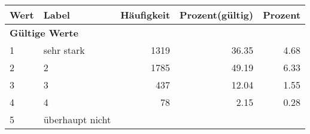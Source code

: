      \begin{longtable}{lXrrr}
     \toprule
     \textbf{Wert} & \textbf{Label} & \textbf{Häufigkeit} & \textbf{Prozent(gültig)} & \textbf{Prozent} \\
     \endhead
     \midrule
     \multicolumn{5}{l}{\textbf{Gültige Werte}}\\

     1 &
     \multicolumn{1}{X}{ sehr stark   } &


       \num{1319} &
       \num[round-mode=places,round-precision=2]{36.35} &
         \num[round-mode=places,round-precision=2]{4.68} \\

     2 &
     \multicolumn{1}{X}{ 2   } &


       \num{1785} &
       \num[round-mode=places,round-precision=2]{49.19} &
         \num[round-mode=places,round-precision=2]{6.33} \\

     3 &
     \multicolumn{1}{X}{ 3   } &


       \num{437} &
       \num[round-mode=places,round-precision=2]{12.04} &
         \num[round-mode=places,round-precision=2]{1.55} \\

     4 &
     \multicolumn{1}{X}{ 4   } &


       \num{78} &
       \num[round-mode=places,round-precision=2]{2.15} &
         \num[round-mode=places,round-precision=2]{0.28} \\

     5 &
     \multicolumn{1}{X}{ überhaupt nicht   } &



\end{longtable}
